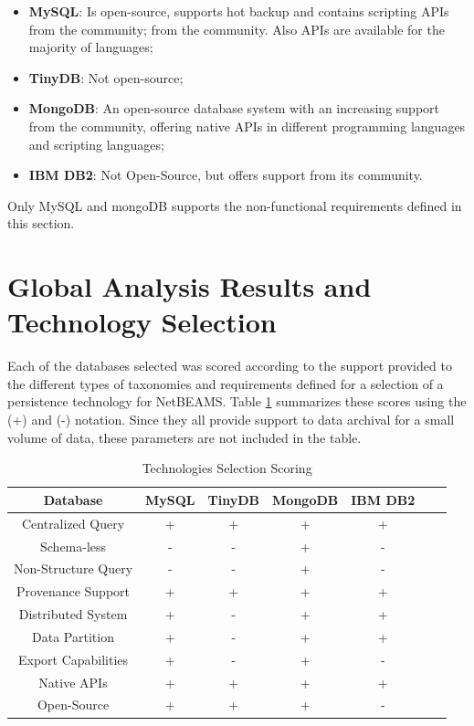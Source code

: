 \begin{itemize}
  \item \textbf{MySQL}: Is  open-source, supports hot backup and contains
  scripting APIs from  the community;
  from the community. Also APIs are available for the majority of languages;
  \item \textbf{TinyDB}: Not open-source;
  \item \textbf{MongoDB}: An open-source database system with an increasing
  support from  the community, offering native APIs in different programming
  languages and scripting languages;
  \item \textbf{IBM DB2}: Not Open-Source, but offers support from its
  community.
\end{itemize}

Only MySQL and mongoDB supports the non-functional requirements defined in this
section.

\section{Global Analysis Results and Technology Selection}

Each of the databases selected was scored according to the support provided to
the different types of taxonomies and requirements defined for a selection of a
persistence technology for NetBEAMS. Table \ref{tab:technology-selection}
summarizes these scores using the (+) and (-) notation. Since they all provide
support to data archival for a small volume of data, these parameters are not
included in the table.

\begin{table}
    \label{tab:technology-selection}
    \begin{center}
        \begin{tabular}[!t]{|c|c|c|c|c|c|c|}\hline 
        \textbf{Database} & \textbf{MySQL} & \textbf{TinyDB} & \textbf{MongoDB} & \textbf{IBM DB2}\\\hline
        Centralized Query & + & + & + & + \\\hline 
        Schema-less & - & - & + & -\\\hline 
        Non-Structure Query & - & - & + & -\\\hline 
        Provenance Support & + & + & + & +\\\hline 
        Distributed System & + & - & + & +\\\hline 
        Data Partition & + & - & + & +\\\hline 
        Export Capabilities & + & - & + & -\\\hline 
        Native APIs & + & + & + & +\\\hline
        Open-Source & + & + & + & -\\\hline
        \end{tabular}
        \caption{Technologies Selection Scoring}
    \end{center}
\end{table}

